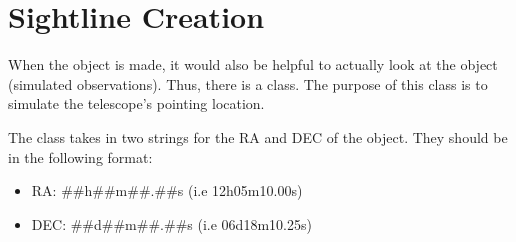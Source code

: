 \documentclass[letterpaper,10pt,english]{sphinxmanual}
\begin{document}
\begin{sphinxVerbatim}[commandchars=\\\{\}]

     

 
      \PYG{p}{[}\PYG{p}{]}\PYG{p}{[}\PYG{p}{]}


     

  
\end{sphinxVerbatim}


\section{Sightline Creation}
\label{\detokenize{quickstart:sightline-creation}}
When the object is made, it would also be helpful to actually look at the object (simulated observations). Thus, there is a {\hyperref[\detokenize{model_observing:model_observing.Sightline}]{}} class. The purpose of this class is to simulate the telescope’s pointing location.

The {\hyperref[\detokenize{model_observing:model_observing.Sightline}]{}} class takes in two strings for the RA and DEC of the object. They should be in the following format:
\begin{itemize}
\item {} 
RA: \#\#h\#\#m\#\#.\#\#s (i.e 12h05m10.00s)

\item {} 
DEC: \#\#d\#\#m\#\#.\#\#s (i.e 06d18m10.25s)

\end{itemize}
\end{document}
